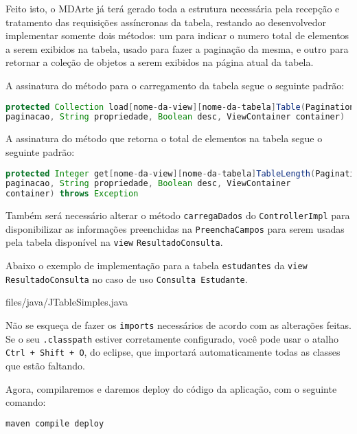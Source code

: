 Feito isto, o MDArte já terá gerado toda a estrutura necessária pela recepção e
tratamento das requisições assíncronas da tabela, restando ao desenvolvedor
implementar somente dois métodos: um para indicar o numero total de elementos a
serem exibidos na tabela, usado para fazer a paginação da mesma, e outro para
retornar a coleção de objetos a serem exibidos na página atual da tabela.

A assinatura do método para o carregamento da tabela segue o seguinte padrão:

\begin{lstlisting}[language=java, frame=single, breaklines=true]
protected Collection load[nome-da-view][nome-da-tabela]Table(PaginationStrategy
paginacao, String propriedade, Boolean desc, ViewContainer container)
\end{lstlisting}

A assinatura do método que retorna o total de elementos na tabela segue o
seguinte padrão:

\begin{lstlisting}[language=java, frame=single, breaklines=true]
protected Integer get[nome-da-view][nome-da-tabela]TableLength(PaginationStrategy
paginacao, String propriedade, Boolean desc, ViewContainer
container) throws Exception
\end{lstlisting}

Também será necessário alterar o método \texttt{carregaDados} do
\texttt{ControllerImpl} para disponibilizar as informações preenchidas na
\texttt{PreenchaCampos} para serem usadas pela tabela disponível na
\texttt{view} \texttt{ResultadoConsulta}.

Abaixo o exemplo de implementação para a tabela \texttt{estudantes} da
\texttt{view ResultadoConsulta} no caso de uso \texttt{Consulta Estudante}.

 {files/java/JTableSimples.java}

Não se esqueça de fazer os \texttt{imports} necessários de acordo com as
alterações feitas. Se o seu \texttt{.classpath} estiver corretamente
configurado, você pode usar o atalho \texttt{Ctrl + Shift + O}, do eclipse, que
importará automaticamente todas as classes que estão faltando.

Agora, compilaremos e daremos deploy do código da aplicação, com o seguinte
comando:

\begin{lstlisting}[language=bash, frame=single, breaklines=true]
maven compile deploy
\end{lstlisting}

